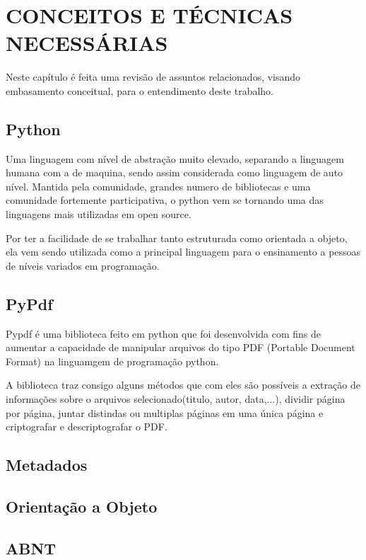 \chapter{CONCEITOS E TÉCNICAS NECESSÁRIAS}

Neste capítulo é feita uma revisão de assuntos relacionados, visando embasamento conceitual, para o entendimento deste trabalho.


\section{Python}

Uma linguagem com nível de abstração muito elevado, separando a linguagem humana com a de maquina, sendo assim considerada como linguagem de auto nível. Mantida pela comunidade, grandes numero de bibliotecas e uma comunidade fortemente participativa, o python vem se tornando uma das linguagens mais utilizadas em open source.

Por ter a facilidade de se trabalhar tanto estruturada como orientada a objeto, ela vem sendo utilizada como a principal linguagem para o ensinamento a pessoas de níveis variados em programação.

\section{PyPdf}

Pypdf é uma biblioteca feito em python que foi desenvolvida com fins de aumentar a capacidade de manipular arquivos do tipo PDF (Portable Document Format) na linguamgem de programação python.

A biblioteca traz consigo alguns métodos que com eles são possíveis a extração de informações sobre o arquivos selecionado(titulo, autor, data,...), dividir  página por página, juntar distindas ou multiplas páginas em uma única página e criptografar e descriptografar o PDF.


\section{Metadados}

\section{Orientação a Objeto}

\section{ABNT}



